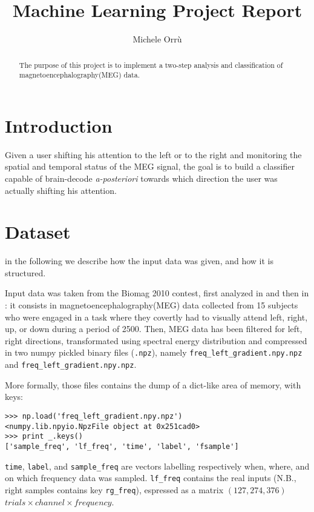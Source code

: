 \documentclass[10pt]{article}
\title{\textbf{Machine Learning Project Report }}
\author{Michele Orr\`u}
\begin{document}
\newcommand{\code}[1]{\texttt{#1}}
\maketitle
\begin{abstract}
The purpose of this project is to implement a two-step analysis and classification of magnetoencephalography(MEG) data. 
\end{abstract}


\section{Introduction}
Given a user shifting his attention to the left or to the right and monitoring the spatial and temporal status of the MEG\cite{Biomag2010} signal, the goal is to build a classifier capable of brain-decode \textit{a-posteriori} towards which direction the user was actually shifting his attention.



\section{Dataset}
\label{dataset}
in the following we describe how the input data was given, and how it is structured. 

\noindent
Input data was taken from the Biomag 2010 contest, first analyzed in 
\cite{Biomag2010} and then in \cite{Braindecoding}: it consists in
 magnetoencephalography(MEG) data collected from 15 subjects who were engaged in
a task where they covertly had to visually attend left, right, up, or down during a
period of 2500\milli\second. 
Then, MEG data has been filtered for left, right directions, transformated using spectral energy distribution and compressed in two numpy pickled binary files
 (\code{.npz}), namely \code{freq\_left\_gradient.npy.npz}
 and \code{freq\_left\_gradient.npy.npz}.

More formally, those files contains the dump of a dict-like area of memory, with keys:
\begin{verbatim}
>>> np.load('freq_left_gradient.npy.npz')
<numpy.lib.npyio.NpzFile object at 0x251cad0>
>>> print _.keys()
['sample_freq', 'lf_freq', 'time', 'label', 'fsample']
\end{verbatim}

\code{time}, \code{label}, and \code{sample\_freq} are vectors labelling respectively when, where, and on which frequency data was sampled.
\code{lf\_freq} contains the real inputs (N.B., right samples contains key \code{rg\_freq}), espressed as a matrix $(127, 274, 376)$ $trials \times channel \times frequency$.
\end{document}
